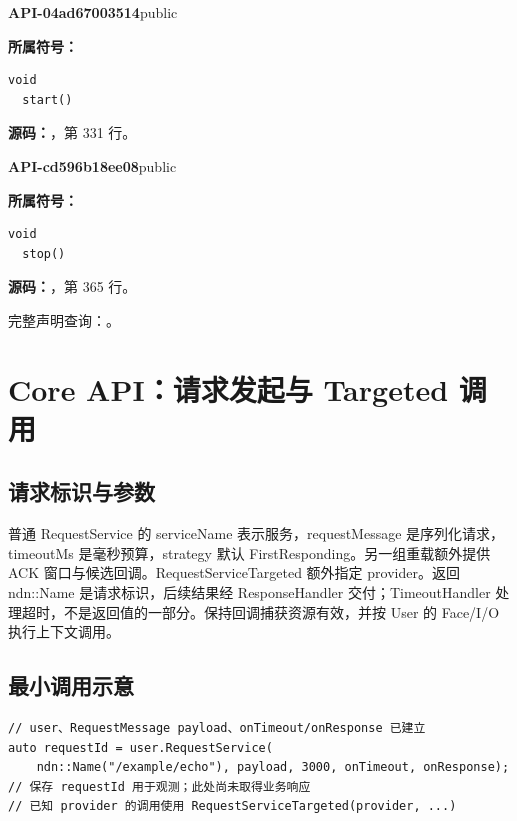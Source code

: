 \textbf{API-04ad67003514}\quad public\par
\textbf{所属符号：}\par
\begin{Verbatim}[fontsize=\footnotesize,breaklines,breakanywhere]
void
  start()
\end{Verbatim}
\textbf{源码：}，第 331 行。\par

\textbf{API-cd596b18ee08}\quad public\par
\textbf{所属符号：}\par
\begin{Verbatim}[fontsize=\footnotesize,breaklines,breakanywhere]
void
  stop()
\end{Verbatim}
\textbf{源码：}，第 365 行。\par

完整声明查询：。

\section{Core API：请求发起与 Targeted 调用}

\subsection{请求标识与参数}
普通 RequestService 的 serviceName 表示服务，requestMessage 是序列化请求，timeoutMs 是毫秒预算，strategy 默认 FirstResponding。另一组重载额外提供 ACK 窗口与候选回调。RequestServiceTargeted 额外指定 provider。返回 ndn::Name 是请求标识，后续结果经 ResponseHandler 交付；TimeoutHandler 处理超时，不是返回值的一部分。保持回调捕获资源有效，并按 User 的 Face/I/O 执行上下文调用。

\subsection{最小调用示意}

\begin{Verbatim}[fontsize=\footnotesize,breaklines,breakanywhere]
// user、RequestMessage payload、onTimeout/onResponse 已建立
auto requestId = user.RequestService(
    ndn::Name("/example/echo"), payload, 3000, onTimeout, onResponse);
// 保存 requestId 用于观测；此处尚未取得业务响应
// 已知 provider 的调用使用 RequestServiceTargeted(provider, ...)
\end{Verbatim}

